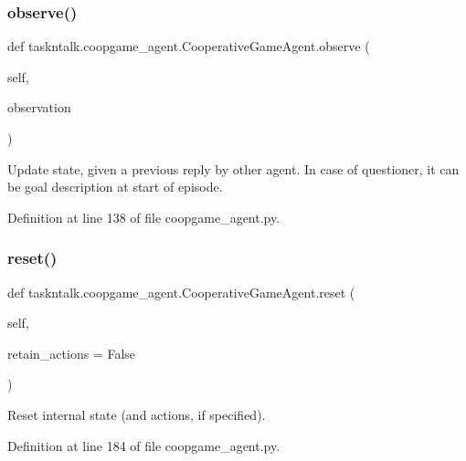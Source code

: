 \subsubsection{\texorpdfstring{observe()}{observe()}}
{\footnotesize\ttfamily def taskntalk.\+coopgame\+\_\+agent.\+Cooperative\+Game\+Agent.\+observe (\begin{DoxyParamCaption}\item[{}]{self,  }\item[{}]{observation }\end{DoxyParamCaption})}

\begin{DoxyVerb}Update state, given a previous reply by other agent. In case of
questioner, it can be goal description at start of episode.
\end{DoxyVerb}
 

Definition at line 138 of file coopgame\+\_\+agent.\+py.

\mbox{\label{classtaskntalk_1_1coopgame__agent_1_1CooperativeGameAgent_a0133b3dda42271d18312205f4035bc59}} 
\subsubsection{\texorpdfstring{reset()}{reset()}}
{\footnotesize\ttfamily def taskntalk.\+coopgame\+\_\+agent.\+Cooperative\+Game\+Agent.\+reset (\begin{DoxyParamCaption}\item[{}]{self,  }\item[{}]{retain\+\_\+actions = {\ttfamily False} }\end{DoxyParamCaption})}

\begin{DoxyVerb}Reset internal state (and actions, if specified).\end{DoxyVerb}
 

Definition at line 184 of file coopgame\+\_\+agent.\+py.

\mbox{\label{classtaskntalk_1_1coopgame__agent_1_1CooperativeGameAgent_ad4a768b95069e59032643450d45e6cb6}} 
